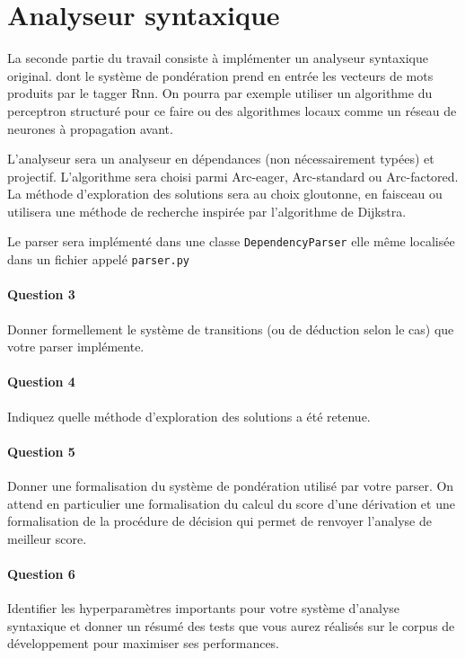 \documentclass[a4paper,11pt]{article}
\begin{document}
\section{Analyseur syntaxique}

La seconde partie du travail consiste à implémenter un analyseur syntaxique
original. dont le système de pondération prend en entrée les vecteurs de mots produits par le tagger {\sc Rnn}. On pourra par exemple utiliser un algorithme du perceptron structuré pour ce faire ou des algorithmes locaux comme un réseau de neurones à propagation avant.

L'analyseur sera un analyseur en dépendances (non nécessairement typées) et projectif.
L'algorithme sera choisi parmi Arc-eager, Arc-standard ou Arc-factored. La méthode d'exploration des solutions sera au choix gloutonne, en faisceau ou utilisera une méthode de recherche inspirée par l'algorithme de Dijkstra. 

Le parser sera implémenté dans une classe \verb+DependencyParser+ elle même localisée dans un fichier appelé \verb+parser.py+

\paragraph{Question 3} Donner formellement le système de transitions (ou de déduction selon le cas) que votre parser implémente.

\paragraph{Question 4} Indiquez quelle méthode d'exploration des solutions a été retenue.

\paragraph{Question 5} Donner une formalisation du système de pondération utilisé par votre parser. On attend en particulier une formalisation du calcul du score d'une dérivation et une formalisation de la procédure de décision qui permet de renvoyer l'analyse de meilleur score.

\paragraph{Question 6} Identifier les hyperparamètres importants pour votre système d'analyse syntaxique et donner un résumé des tests que vous aurez réalisés sur le corpus de développement pour maximiser ses performances.
\end{document}
